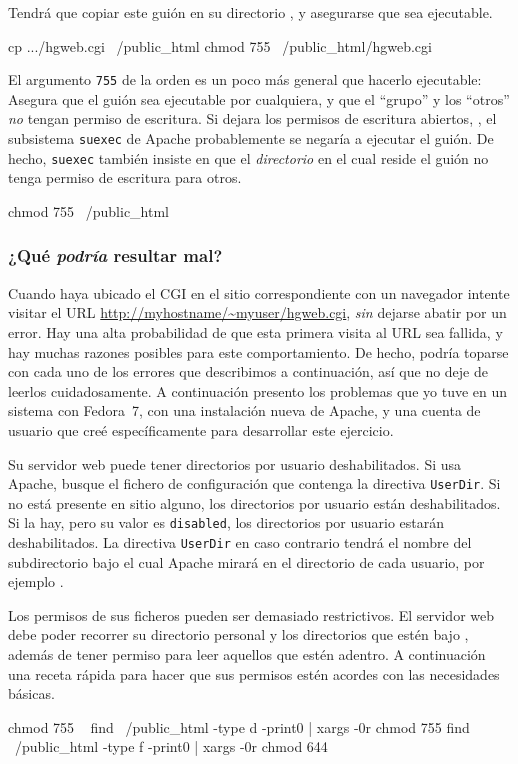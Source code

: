 Tendrá que copiar este guión en su directorio ,
y asegurarse que sea ejecutable.
\begin{codesample2}
  cp .../hgweb.cgi ~/public_html
  chmod 755 ~/public_html/hgweb.cgi
\end{codesample2}
El argumento \texttt{755} de la orden  es un poco más
general que hacerlo ejecutable: Asegura que el guión sea ejecutable
por cualquiera, y que el ``grupo'' y los ``otros'' \emph{no}  tengan
permiso de escritura.  Si dejara los permisos de escritura abiertos,
, el subsistema \texttt{suexec} de  Apache probablemente se negaría
a ejecutar el guión.  De hecho, \texttt{suexec} también insiste en que
el \emph{directorio} en el cual reside el guión no tenga permiso de
escritura para otros.
\begin{codesample2}
  chmod 755 ~/public_html
\end{codesample2}

\subsubsection{¿Qué \emph{podría} resultar mal?}
\label{sec:collab:wtf}

Cuando haya ubicado el CGI en el sitio correspondiente con un navegador
intente visitar el URL \url{http://myhostname/~myuser/hgweb.cgi},
\emph{sin} dejarse abatir por un error.  Hay una alta probabilidad de
que esta primera visita al URL sea fallida, y hay muchas razones posibles
para este comportamiento.  De hecho, podría toparse con cada uno de los
errores que describimos a continuación, así que no deje de leerlos
cuidadosamente.   A continuación presento los problemas que yo tuve en
un sistema con Fedora~7, con una instalación nueva de Apache, y una
cuenta de usuario que creé específicamente para desarrollar este
ejercicio.

Su servidor web puede tener directorios por usuario deshabilitados. Si
usa Apache, busque el fichero de configuración que contenga la
directiva \texttt{UserDir}.  Si no está presente en sitio alguno, los
directorios por usuario están deshabilitados.  Si la hay, pero su
valor es \texttt{disabled}, los directorios por usuario estarán
deshabilitados. La directiva \texttt{UserDir} en caso contrario tendrá
el nombre del subdirectorio bajo el cual Apache mirará en el
directorio de cada usuario, por ejemplo .

Los permisos de sus ficheros pueden ser demasiado restrictivos.  El
servidor web debe poder recorrer su directorio personal y los
directorios que estén bajo , además de tener
permiso para leer aquellos que estén adentro.  A continuación una
receta rápida para hacer que sus permisos estén acordes con las
necesidades básicas.
\begin{codesample2}
  chmod 755 ~
  find ~/public_html -type d -print0 | xargs -0r chmod 755
  find ~/public_html -type f -print0 | xargs -0r chmod 644
\end{codesample2}

